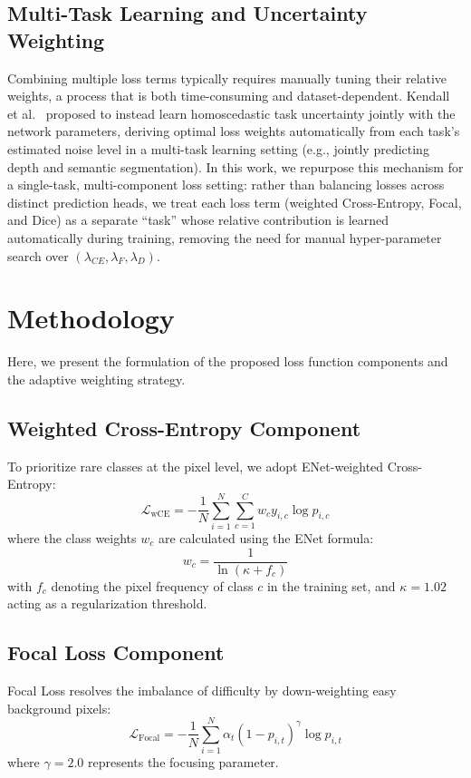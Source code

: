 \documentclass[journal,compsoc]{IEEEtran}
\newcommand{\loss}[1]{\mathcal{L}_{\text{#1}}}
\begin{document}
\subsection{Multi-Task Learning and Uncertainty Weighting}
Combining multiple loss terms typically requires manually tuning their relative weights, a process that is both time-consuming and dataset-dependent. Kendall et al.~\cite{kendall2018multi} proposed to instead learn homoscedastic task uncertainty jointly with the network parameters, deriving optimal loss weights automatically from each task's estimated noise level in a multi-task learning setting (e.g., jointly predicting depth and semantic segmentation). In this work, we repurpose this mechanism for a single-task, multi-component loss setting: rather than balancing losses across distinct prediction heads, we treat each loss term (weighted Cross-Entropy, Focal, and Dice) as a separate ``task'' whose relative contribution is learned automatically during training, removing the need for manual hyper-parameter search over $(\lambda_{CE}, \lambda_F, \lambda_D)$.


\section{Methodology}
\label{sec:methodology}
Here, we present the formulation of the proposed loss function components and the adaptive weighting strategy.

\subsection{Weighted Cross-Entropy Component}
To prioritize rare classes at the pixel level, we adopt ENet-weighted Cross-Entropy:
\begin{equation}
\loss{wCE} = -\frac{1}{N}\sum_{i=1}^{N}\sum_{c=1}^{C} w_c y_{i,c} \log p_{i,c}
\end{equation}
where the class weights $w_c$ are calculated using the ENet formula:
\begin{equation}
w_c = \frac{1}{\ln(\kappa + f_c)}
\end{equation}
with $f_c$ denoting the pixel frequency of class $c$ in the training set, and $\kappa = 1.02$ acting as a regularization threshold.

\subsection{Focal Loss Component}
Focal Loss resolves the imbalance of difficulty by down-weighting easy background pixels:
\begin{equation}
\loss{Focal} = -\frac{1}{N}\sum_{i=1}^{N} \alpha_t (1 - p_{i,t})^\gamma \log p_{i,t}
\end{equation}
where $\gamma = 2.0$ represents the focusing parameter.
\end{document}
